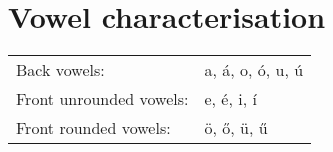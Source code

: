 \documentclass{article}
\begin{document}
\section{Vowel characterisation}
\begin{table}[h]
\centering
\begin{tabular} { l l } \toprule
	Back vowels: & a, á, o, ó, u, ú \\
	Front unrounded vowels: & e, é, i, í \\
	Front rounded vowels: & ö, ő, ü, ű \\ \bottomrule
\end{tabular}
\end{table}		
\end{document}
